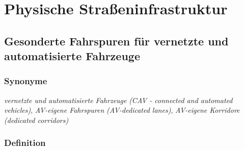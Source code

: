 \documentclass[
]{book}
\begin{document}
\hypertarget{infrastructure}{%
\chapter{Physische Straßeninfrastruktur}\label{infrastructure}}

\hypertarget{dedicated_lanes}{%
\section{Gesonderte Fahrspuren für vernetzte und automatisierte Fahrzeuge}\label{dedicated_lanes}}

\hypertarget{synonyme}{%
\subsection*{Synonyme}\label{synonyme}}

\emph{vernetzte und automatisierte Fahrzeuge} \emph{(CAV - connected and automated vehicles)}, \emph{AV-eigene Fahrspuren} \emph{(AV-dedicated lanes)}, \emph{AV-eigene Korridore} \emph{(dedicated corridors)}

\hypertarget{definition}{%
\subsection*{Definition}\label{definition}}
\end{document}
